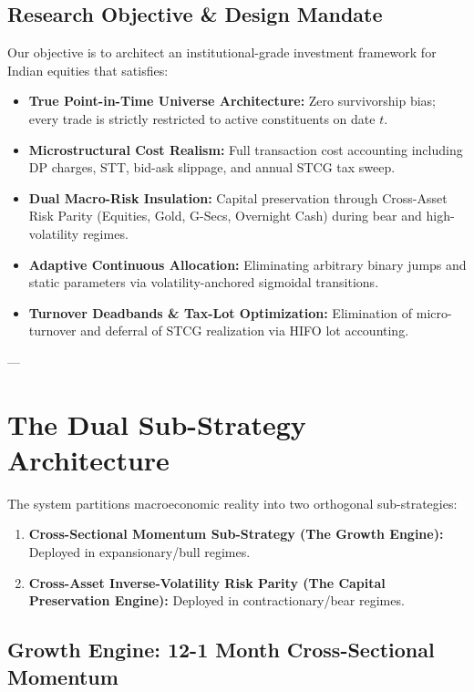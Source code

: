 \documentclass[11pt,a4paper]{article}
\begin{document}
\subsection{Research Objective \& Design Mandate}
Our objective is to architect an institutional-grade investment framework for Indian equities that satisfies:
\begin{itemize}[leftmargin=*]
    \item \textbf{True Point-in-Time Universe Architecture:} Zero survivorship bias; every trade is strictly restricted to active constituents on date $t$.
    \item \textbf{Microstructural Cost Realism:} Full transaction cost accounting including DP charges, STT, bid-ask slippage, and annual STCG tax sweep.
    \item \textbf{Dual Macro-Risk Insulation:} Capital preservation through Cross-Asset Risk Parity (Equities, Gold, G-Secs, Overnight Cash) during bear and high-volatility regimes.
    \item \textbf{Adaptive Continuous Allocation:} Eliminating arbitrary binary jumps and static parameters via volatility-anchored sigmoidal transitions.
    \item \textbf{Turnover Deadbands \& Tax-Lot Optimization:} Elimination of micro-turnover and deferral of STCG realization via HIFO lot accounting.
\end{itemize}

---

\section{The Dual Sub-Strategy Architecture}

The system partitions macroeconomic reality into two orthogonal sub-strategies:
\begin{enumerate}
    \item \textbf{Cross-Sectional Momentum Sub-Strategy (The Growth Engine):} Deployed in expansionary/bull regimes.
    \item \textbf{Cross-Asset Inverse-Volatility Risk Parity (The Capital Preservation Engine):} Deployed in contractionary/bear regimes.
\end{enumerate}

\subsection{Growth Engine: 12-1 Month Cross-Sectional Momentum}
\end{document}
